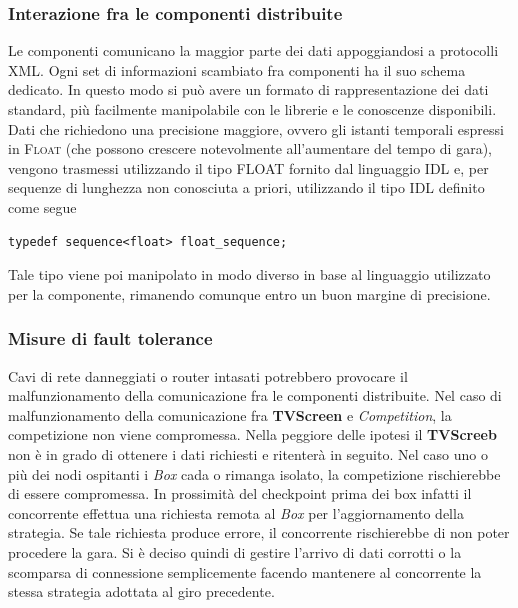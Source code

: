 \subsubsection{Interazione fra le componenti distribuite}
Le componenti comunicano la maggior parte dei dati appoggiandosi a protocolli XML. Ogni set di informazioni scambiato fra componenti ha il suo schema dedicato. In questo
modo si pu\`{o} avere un formato di rappresentazione dei dati standard, pi\`{u} facilmente manipolabile con le librerie e le conoscenze disponibili. 
Dati che richiedono una precisione maggiore, ovvero gli istanti temporali espressi in \textsc{Float} (che possono crescere notevolmente all'aumentare del tempo di gara),
vengono trasmessi utilizzando il tipo FLOAT fornito dal linguaggio IDL e, per sequenze di lunghezza non conosciuta a priori, utilizzando il tipo IDL definito come segue
\begin{lstlisting}
typedef sequence<float> float_sequence;
\end{lstlisting}
Tale tipo viene poi manipolato in modo diverso in base al linguaggio utilizzato per la componente, rimanendo comunque entro un buon margine di precisione.
\subsubsection{Misure di fault tolerance}
Cavi di rete danneggiati o router intasati potrebbero provocare il malfunzionamento della comunicazione fra le componenti distribuite. Nel caso di malfunzionamento
della comunicazione fra \textbf{TVScreen} e \emph{Competition}, la competizione non viene compromessa. Nella peggiore delle ipotesi il \textbf{TVScreeb} non \`{e} in grado
di ottenere i dati richiesti e ritenter\`{a} in seguito. Nel caso uno o pi\`{u} dei nodi ospitanti i \emph{Box} cada o rimanga isolato, la competizione rischierebbe
di essere compromessa. In prossimit\`{a} del checkpoint prima dei box infatti il concorrente effettua una richiesta remota al \emph{Box} per l'aggiornamento della strategia.
Se tale richiesta produce errore, il concorrente rischierebbe di non poter procedere la gara. Si \`{e} deciso quindi di gestire l'arrivo di dati corrotti o la scomparsa di 
connessione semplicemente facendo mantenere al concorrente la stessa strategia adottata al giro precedente.
